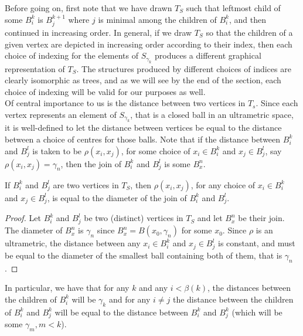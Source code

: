 Before going on, first note that we have drawn $T_S$ such that leftmost child of some $B^k_i$ is $B^{k+1}_j$ where $j$ is minimal among the children of $B^k_i$, and then continued in increasing order. In general, if we draw $T_S$ so that the children of a given vertex are depicted in increasing order according to their index, then  each choice of indexing for the elements of $S_{\gamma_k}$ produces a different graphical representation of $T_S$. The structures produced by different choices of indices are clearly isomorphic as trees, and as we will see by the end of the section, each choice of indexing will be valid for our purposes as well.\\

Of central importance to us is the distance between two vertices in $T_s$. Since each vertex represents an element of $S_{\gamma_k}$, that is a closed ball in an ultrametric space, it is well-defined to let the distance between vertices be equal to the distance between a choice of centres for those balls. Note that if the distance between $B^k_i$ and $B^l_j$ is taken to be $\rho(x_i,x_j)$, for some choice of $x_i \in B^k_i$ and $x_j \in B^l_j$, say $\rho(x_i,x_j)=\gamma_n$, then the join of  $B^k_i$ and $B^l_j$ is some $B^n_x$.\\

\begin{lemma}
If $B^k_i$ and $B^l_j$ are two vertices in $T_S$, then $\rho(x_i,x_j)$, for any choice of  $x_i \in B^k_i$ and $x_j \in B^l_j$, is equal to the diameter of the join of  $B^k_i$ and $B^l_j$. 
\end{lemma}

\begin{proof}
Let $B^k_i$ and $B^l_j$ be two (distinct) vertices in $T_S$ and let $B^n_x$ be their join. The diameter of $B^n_x$ is $\gamma_n$ since $B^n_x=B(x_0, \gamma_n)$ for some $x_0$. Since $\rho$ is an ultrametric, the distance between any  $x_i \in B^k_i$ and $x_j \in B^l_j$ is constant, and must be equal to the diameter of the smallest ball containing both of them, that is $\gamma_n$.
\end{proof}

In particular, we have that for any $k$ and any $i < \beta(k)$, the distances between the children of $B^k_i$ will be $\gamma_k$ and for any $i \neq j$ the distance between the children of $B^k_i$ and $B^k_j$ will be equal to the distance between  $B^k_i$ and $B^k_j$ (which will be some $\gamma_{m}, m <k$).\\

